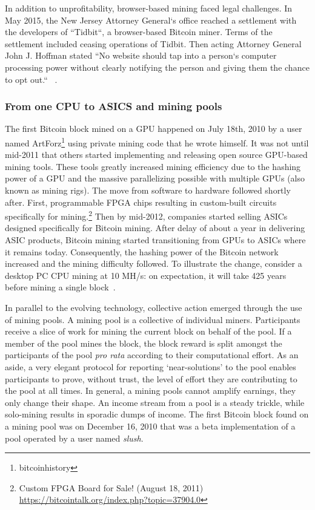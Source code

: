 In addition to unprofitability, browser-based mining faced legal challenges. In May 2015, the New Jersey Attorney General`s office reached a settlement with the developers of ``Tidbit``, a browser-based Bitcoin miner. Terms of the settlement included ceasing operations of Tidbit. Then acting Attorney General John J. Hoffman stated ``No website should tap into a person`s computer processing power without clearly notifying the person and giving them the chance to opt out.`` ~\cite{njcourtbitcoinjsminer}.

\subsubsection{From one CPU to ASICS and mining pools}


The first Bitcoin block mined on a GPU happened on July 18th, 2010 by a user named ArtForz\footnote{bitcoinhistory} using private mining code that he wrote himself. It was not until mid-2011 that others started implementing and releasing open source GPU-based mining tools. These tools greatly increased mining efficiency due to the hashing power of a GPU and the massive parallelizing possible with multiple GPUs (also known as mining rigs). The move from software to hardware followed shortly after. First, programmable FPGA chips resulting in custom-built circuits specifically for mining.\footnote{Custom FPGA Board for Sale! (August 18, 2011) \url{https://bitcointalk.org/index.php?topic=37904.0}} Then by mid-2012, companies started selling ASICs designed specifically for Bitcoin mining. After delay of about a year in delivering ASIC products, Bitcoin mining started transitioning from GPUs to ASICs where it remains today. Consequently, the hashing power of the Bitcoin network increased and the mining difficulty followed. To illustrate the change, consider a desktop PC CPU mining at 10 MH/s: on expectation, it will take 425 years before mining a single block~\cite{huang2014botcoin}. 

In parallel to the evolving technology, collective action emerged through the use of mining pools. A mining pool is a collective of individual miners. Participants receive a slice of work for mining the current block on behalf of the pool. If a member of the pool mines the block, the block reward is split amongst the participants of the pool \textit{pro rata} according to their computational effort. As an aside, a very elegant protocol for reporting `near-solutions' to the pool enables participants to prove, without trust, the level of effort they are contributing to the pool at all times. In general, a mining pools cannot amplify earnings, they only change their shape. An income stream from a pool is a steady trickle, while solo-mining results in sporadic dumps of income. The first Bitcoin block found on a mining pool was on December 16, 2010 that was a beta implementation of a pool operated by a user named \textit{slush}.

